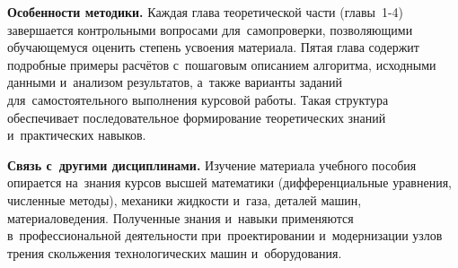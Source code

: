 \textbf{Особенности методики.} Каждая глава теоретической части (главы~1-4) завершается контрольными вопросами для~самопроверки, позволяющими обучающемуся оценить степень усвоения материала. Пятая глава содержит подробные примеры расчётов с~пошаговым описанием алгоритма, исходными данными и~анализом результатов, а~также варианты заданий для~самостоятельного выполнения курсовой работы. Такая структура обеспечивает последовательное формирование теоретических знаний и~практических навыков.

\textbf{Связь с~другими дисциплинами.} Изучение материала учебного пособия опирается на~знания курсов высшей математики (дифференциальные уравнения, численные методы), механики жидкости и~газа, деталей машин, материаловедения. Полученные знания и~навыки применяются в~профессиональной деятельности при~проектировании и~модернизации узлов трения скольжения технологических машин и~оборудования.
